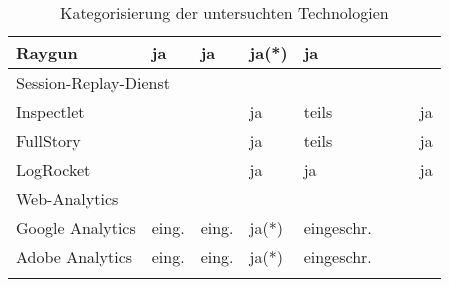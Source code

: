 \begin{longtable}{|p{4.10cm}|p{0.90cm}|p{0.90cm}|p{1.9cm}|p{1.75cm}|p{1.5cm}|p{1.4cm}|p{1.3cm}|}
\hline
Raygun & ja & ja & ja(*) & ja &  &  &  \\
\hline
\hline
\multicolumn{8}{|l|}{Session-Replay-Dienst} \\
\hline
Inspectlet &  &  & ja & teils &  &  & ja \\
\hline
FullStory &  &  & ja & teils &  &  & ja \\
\hline
LogRocket &  &  & ja & ja &  &  & ja \\
\hline
\hline
\multicolumn{8}{|l|}{Web-Analytics} \\
\hline
Google Analytics & eing. & eing. & ja(*) & eingeschr. &  &  &  \\
\hline
Adobe Analytics & eing. & eing. & ja(*) & eingeschr. &  &  &  \\
\hline
\caption{Kategorisierung der untersuchten Technologien}
\label{tab:technologie-kategorisierung}
\end{longtable}
\endgroup
